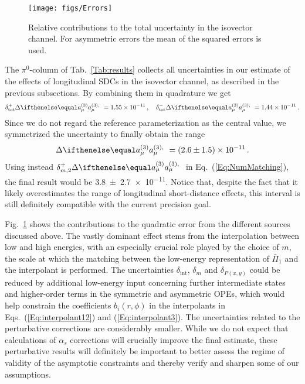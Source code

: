
\begin{figure}
	\centering
	\texttt{[image: figs/Errors]}
	
	\caption{Relative contributions to the total uncertainty in the isovector channel. For asymmetric errors the mean of the squared errors is used.}
	\label{Fig:PieChartErrors}
\end{figure}


The $\pi^0$-column of Tab.~\ref{Tab:results} collects all uncertainties in our estimate of the effects of longitudinal SDCs in the isovector channel, as described in the previous subsections. By combining them in quadrature we get
\begin{equation}
\delta_\text{tot}^+ \Delta \aPion = \num{1.55e-11}\,, \quad \delta_\text{tot}^- \Delta \aPion = \num{1.44e-11}\,.
\end{equation}
Since we do not regard the reference parameterization as the central value, we symmetrized the uncertainty to finally obtain the range
\begin{equation}
\Delta \aPion = \num[separate-uncertainty]{2.6\pm 1.5 e-11}\, .
\end{equation}
Using instead $\delta_{m, 2}^+ \Delta \aPion$ in Eq.~(\ref{Eq:NumMatching}), the final result would be \num[separate-uncertainty]{3.8 \pm 2.7e-11}. Notice that, despite the fact that it likely overestimates the range of longitudinal short-distance effects, this interval is still definitely compatible with the current precision goal.

Fig.~\ref{Fig:PieChartErrors} shows the contributions to the quadratic error from the different sources discussed above. The vastly dominant effect stems from the interpolation between low and high energies, with an especially crucial role played by the choice of $m$, the scale at which the matching between the low-energy representation of $\bar{\Pi}_1$ and the interpolant is performed. The uncertainties $\delta_\text{int}$, $\delta_m$ and $\delta_{P(x,y)}$ could be reduced by additional low-energy input concerning further intermediate states and higher-order terms in the symmetric and asymmetric OPEs, which would help constrain the coefficients $b_i(r,\phi)$ in the interpolants in Eqs.~(\ref{Eq:interpolant12}) and (\ref{Eq:interpolant3}). The uncertainties related to the perturbative corrections are considerably smaller. While we do not expect that calculations of $\alpha_s$ corrections will crucially improve the final estimate, these perturbative results will definitely be important to better assess the regime of validity of the asymptotic constraints and thereby verify and sharpen some of our assumptions. 

